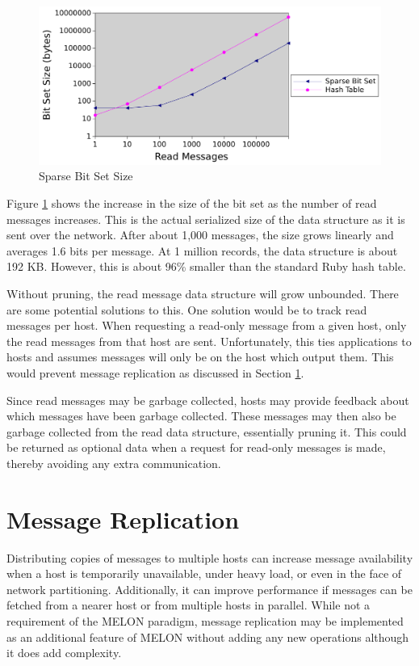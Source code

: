 \begin{figure}
\centering
\includegraphics[width = \textwidth, scale = 0.80]{figures/bitset-size.pdf}
\caption{Sparse Bit Set Size}
\label{fig:bitsetsize}
\end{figure}

Figure \ref{fig:bitsetsize} shows the increase in the size of the bit set as the number of read messages increases. This is the actual serialized size of the data structure as it is sent over the network. After about 1,000 messages, the size grows linearly and averages 1.6 bits per message. At 1 million records, the data structure is about 192 KB. However, this is about 96\% smaller than the standard Ruby hash table.

Without pruning, the read message data structure will grow unbounded. There are some potential solutions to this. One solution would be to track read messages per host. When requesting a read-only message from a given host, only the read messages from that host are sent. Unfortunately, this ties applications to hosts and assumes messages will only be on the host which output them. This would prevent message replication as discussed in Section \ref{sec:replication}.

Since read messages may be garbage collected, hosts may provide feedback about which messages have been garbage collected. These messages may then also be garbage collected from the read data structure, essentially pruning it. This could be returned as optional data when a request for read-only messages is made, thereby avoiding any extra communication.

\section{Message Replication}\label{sec:replication}

Distributing copies of messages to multiple hosts can increase message availability when a host is temporarily unavailable, under heavy load, or even in the face of network partitioning. Additionally, it can improve performance if messages can be fetched from a nearer host or from multiple hosts in parallel. While not a requirement of the MELON paradigm, message replication may be implemented as an additional feature of MELON without adding any new operations although it does add complexity.

